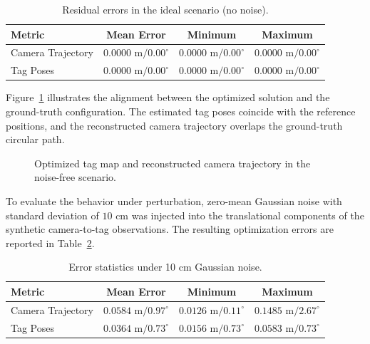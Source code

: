 \documentclass[a4paper,11pt]{article}
\begin{document}
\begin{table}[h!]
	\centering
	\begin{tabular}{|l|c|c|c|}
		\hline
		\textbf{Metric} & \textbf{Mean Error} & \textbf{Minimum} & \textbf{Maximum} \\ \hline
		Camera Trajectory & $0.0000\text{ m} / 0.00^\circ$ & $0.0000\text{ m} / 0.00^\circ$ & $0.0000\text{ m} / 0.00^\circ$ \\ \hline
		Tag Poses         & $0.0000\text{ m} / 0.00^\circ$ & $0.0000\text{ m} / 0.00^\circ$ & $0.0000\text{ m} / 0.00^\circ$ \\ \hline
	\end{tabular}
	\caption{Residual errors in the ideal scenario (no noise).}
	\label{tab:results_ideal}
\end{table}

Figure~\ref{fig:results_ideal} illustrates the alignment between the optimized solution and the ground-truth configuration. The estimated tag poses coincide with the reference positions, and the reconstructed camera trajectory overlaps the ground-truth circular path.

\begin{figure}[ht]
	\centering
	
	\caption{Optimized tag map and reconstructed camera trajectory in the noise-free scenario.}
	\label{fig:results_ideal}
\end{figure}

To evaluate the behavior under perturbation, zero-mean Gaussian noise with standard deviation of $10\text{ cm}$ was injected into the translational components of the synthetic camera-to-tag observations. The resulting optimization errors are reported in Table~\ref{tab:results_noise}.

\begin{table}[h]
	\centering
	\begin{tabular}{|l|c|c|c|}
		\hline
		\textbf{Metric} & \textbf{Mean Error} & \textbf{Minimum} & \textbf{Maximum} \\ \hline
		Camera Trajectory & $0.0584\text{ m} / 0.97^\circ$ & $0.0126\text{ m} / 0.11^\circ$ & $0.1485\text{ m} / 2.67^\circ$ \\ \hline
		Tag Poses         & $0.0364\text{ m} / 0.73^\circ$ & $0.0156\text{ m} / 0.73^\circ$ & $0.0583\text{ m} / 0.73^\circ$ \\ \hline
	\end{tabular}
	\caption{Error statistics under 10 cm Gaussian noise.}
	\label{tab:results_noise}
\end{table}
\end{document}
